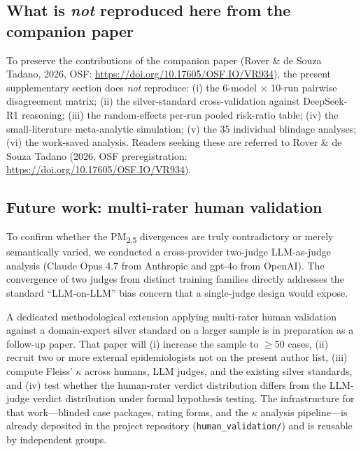 \documentclass[11pt]{article}
\begin{document}
\subsection{What is \emph{not} reproduced here from the companion paper}\label{sec:s12-notreproduced}

To preserve the contributions of the companion paper (Rover \& de Souza Tadano, 2026, OSF: \url{https://doi.org/10.17605/OSF.IO/VR934}), the present supplementary section does \emph{not} reproduce: (i) the 6-model $\times$ 10-run pairwise disagreement matrix; (ii) the silver-standard cross-validation against DeepSeek-R1 reasoning; (iii) the random-effects per-run pooled risk-ratio table; (iv) the small-literature meta-analytic simulation; (v) the 35 individual blindage analyses; (vi) the work-saved analysis. Readers seeking these are referred to Rover \& de Souza Tadano (2026, OSF preregistration: \url{https://doi.org/10.17605/OSF.IO/VR934}).

\subsection{Future work: multi-rater human validation}\label{sec:s12-future-work}

To confirm whether the PM\textsubscript{2.5} divergences are truly contradictory or merely semantically varied, we conducted a cross-provider two-judge LLM-as-judge analysis (Claude Opus 4.7 from Anthropic and gpt-4o from OpenAI). The convergence of two judges from distinct training families directly addresses the standard ``LLM-on-LLM'' bias concern that a single-judge design would expose.

A dedicated methodological extension applying multi-rater human validation against a domain-expert silver standard on a larger sample is in preparation as a follow-up paper. That paper will (i) increase the sample to $\geq$50 cases, (ii) recruit two or more external epidemiologists not on the present author list, (iii) compute Fleiss' $\kappa$ across humans, LLM judges, and the existing silver standards, and (iv) test whether the human-rater verdict distribution differs from the LLM-judge verdict distribution under formal hypothesis testing. The infrastructure for that work---blinded case packages, rating forms, and the $\kappa$ analysis pipeline---is already deposited in the project repository (\texttt{human\_validation/}) and is reusable by independent groups.


\end{document}
